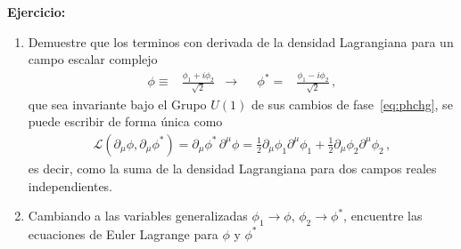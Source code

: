 \begin{frame}
\textbf{Ejercicio:}
\begin{enumerate}
\item  Demuestre que los terminos con derivada de la densidad Lagrangiana para un campo escalar complejo
\begin{align}
  \phi\equiv&\frac{\phi_1+i\phi_2}{\sqrt{2}} &\to&&   \phi^{*}=&\frac{\phi_1-i\phi_2}{\sqrt{2}}\,,
\end{align}
que sea invariante bajo el Grupo $U(1)$ de sus cambios de fase~\eqref{eq:phchg}, se puede escribir de forma única como
\begin{align}
  \label{eq:kincmplx}
  \mathcal{L}(\partial_{\mu} \phi,\partial_{\mu} \phi^{*})=  {\partial_\mu\phi^{*}}\,{\partial^\mu\phi}=\frac{1}{2}\partial_{\mu}\phi_1 \partial^{\mu}\phi_1+\frac{1}{2}\partial_{\mu}\phi_2 \partial^{\mu}\phi_2\,,
\end{align}
es decir, como la suma de la densidad Lagrangiana para dos campos reales independientes.
\item Cambiando a las variables generalizadas $\phi_1\to \phi$, $\phi_2\to \phi^{*}$, encuentre las ecuaciones de Euler Lagrange para $\phi$ y $\phi^{*}$
\end{enumerate}
\end{frame}





